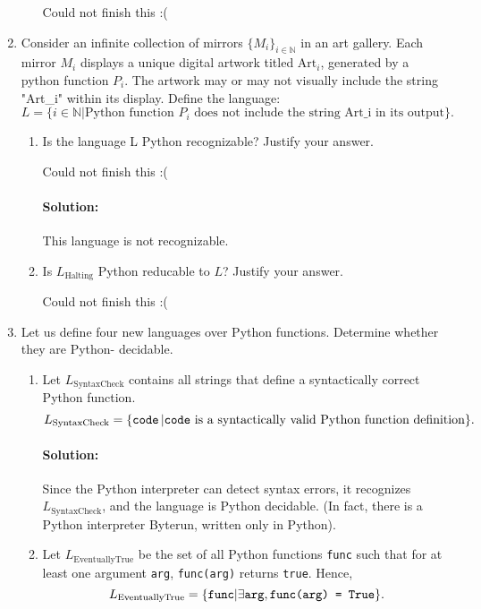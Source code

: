 \documentclass{article}
\begin{document}
\begin{enumerate}
\begin{enumerate}[label= (\alph*)]
                Could not finish this :(

        \end{enumerate}
    \item Consider an infinite collection of mirrors $\{M_i\} _{i\in \mathbb{N}}$ in an art gallery. Each mirror $M_i$ displays a unique digital artwork titled $\mathrm{Art}_i$, generated by a python function $P_i$. The artwork may or may not visually include the string "Art\_i" within its display. Define the language: 
        \[ L=\{i\in \mathbb{N}|\text{Python function } P_i \text{ does not include the string Art\_i in its output}\} .\] 
        \begin{enumerate}[label= (\alph*)] 
            \item Is the language L Python recognizable? Justify your answer.

                Could not finish this :(
                \paragraph{Solution: }This language is not recognizable. 

            \item Is $L_{\text{Halting}}$ Python reducable to $L$? Justify your answer.

                Could not finish this :(
        \end{enumerate}
    \item Let us define four new languages over Python functions. Determine whether they are Python- decidable.
        \begin{enumerate}[label= (\alph*)] 
            \item Let $L_\text{SyntaxCheck}$ contains all strings that define a syntactically correct Python function.
                \[
                    L_\text{SyntaxCheck} =\{\verb|code|\, | \verb|code| \text{ is a syntactically valid Python function definition}\} .\] 
                    \paragraph{Solution: }Since the Python interpreter can detect syntax errors, it recognizes $L_{\text{SyntaxCheck}}$, and the language is Python decidable. (In fact, there is a Python interpreter Byterun, written only in Python).
            \item Let $L_\text{EventuallyTrue}$ be the set of all Python functions \verb|func| such that for at least one argument \verb|arg|, \verb|func(arg)| returns \verb|true|. Hence,
                \[
                    L_\text{EventuallyTrue} =\{\verb|func| | \exists \verb|arg|, \verb|func(arg) = True|\} .\] 

\end{enumerate}
\end{enumerate}
\end{document}
